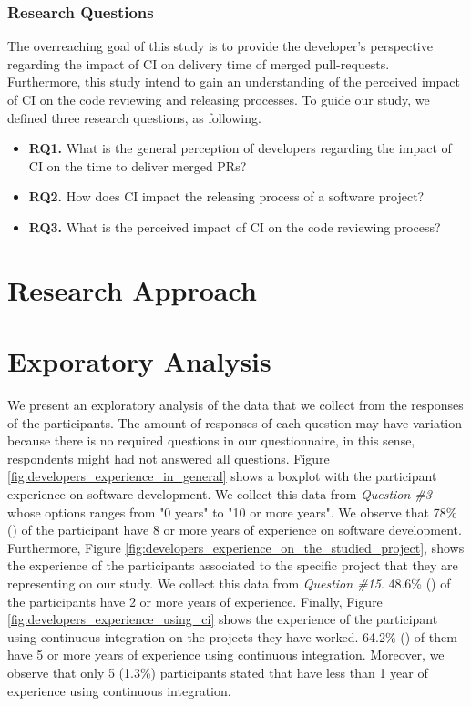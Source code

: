 	\subsubsection{Research Questions}
	\label{sec:qual_study_research_questions}
	
	The overreaching goal of this study is to provide the developer's perspective regarding the impact of CI on delivery time of merged pull-requests. Furthermore, this study intend to gain an understanding of the perceived impact of CI on the code reviewing and releasing processes. To guide our study, we defined three research questions, as following.
	
	\begin{itemize}
		\item \textbf{RQ1.} What is the general perception of developers regarding the impact of CI on the time to deliver merged PRs?
		\item \textbf{RQ2.} How does CI impact the releasing process of a software project?	
		\item \textbf{RQ3.} What is the perceived impact of CI on the code reviewing process?
	\end{itemize}
	
	\section{Research Approach}
	\label{sec:research_approach}
	
	\lipsum*[1]
	
	\section{Exporatory Analysis}
	\label{sec:exploratory_analysis}
	
	We present an exploratory analysis of the data that we collect from the responses of the participants. The amount of responses of each question may have variation because there is no required questions in our questionnaire, in this sense, respondents might had not answered all questions. 
	Figure \ref{fig:developers_experience_in_general} shows a boxplot with the participant experience on software development. We collect this data from \textit{Question \#3} whose options ranges from "0 years" to "10 or more years". We observe that 78\% () of the participant have 8 or more years of experience on software development. Furthermore, Figure \ref{fig:developers_experience_on_the_studied_project}, shows the experience of the participants associated to the specific project that they are representing on our study. We collect this data from \textit{Question \#15}. 48.6\% () of the participants have 2 or more years of experience. Finally, Figure \ref{fig:developers_experience_using_ci} shows the experience of the participant using continuous integration on the projects they have worked. 64.2\%  () of them have 5 or more years of experience using continuous integration. Moreover, we observe that only 5 (1.3\%) participants stated that have less than 1 year of experience using continuous integration. 
	

